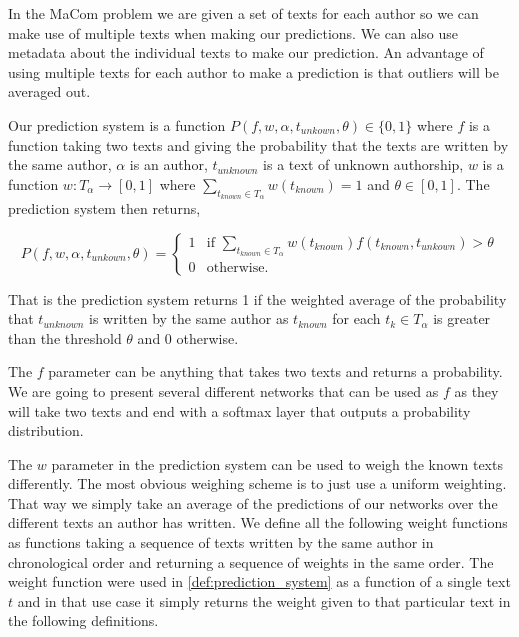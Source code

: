 In the MaCom problem we are given a set of texts for each author so we can make
use of multiple texts when making our predictions. We can also use metadata
about the individual texts to make our prediction. An advantage of using
multiple texts for each author to make a prediction is that outliers will be
averaged out.

\begin{definition}

    \label{def:prediction_system}

    Our prediction system is a function $P(f, w, \alpha, t_{unkown}, \theta)
    \in \{0, 1\}$ where $f$ is a function taking two texts and giving the
    probability that the texts are written by the same author, $\alpha$ is an
    author, $t_{unknown}$ is a text of unknown authorship, $w$ is a function
    $w:T_\alpha \rightarrow [0,1]$ where $\sum_{t_{known} \in T_\alpha}
    w(t_{known}) = 1$ and $\theta \in [0,1]$. The prediction system then
    returns,

    \begin{equation}
        P(f, w, \alpha, t_{unkown}, \theta) = \begin{cases}
            1 & \text{if } \sum_{t_{known} \in T_\alpha} w(t_{known}) f(t_{known}, t_{unkown}) > \theta \\
            0 & \text{otherwise}.
        \end{cases}
    \end{equation}

\end{definition}

That is the prediction system returns 1 if the weighted average of the
probability that $t_{unknown}$ is written by the same author as $t_{known}$ for
each $t_k \in T_\alpha$ is greater than the threshold $\theta$ and 0 otherwise.

The $f$ parameter can be anything that takes two texts and returns a
probability. We are going to present several different networks that can be used
as $f$ as they will take two texts and end with a softmax layer that outputs a
probability distribution.

The $w$ parameter in the prediction system can be used to weigh the known
texts differently. The most obvious weighing scheme is to just use a uniform
weighting. That way we simply take an average of the predictions of our networks
over the different texts an author has written. We define all the following
weight functions as functions taking a sequence of texts written by the same
author in chronological order and returning a sequence of weights in the same
order. The weight function were used in \ref{def:prediction_system} as a
function of a single text $t$ and in that use case it simply returns the weight
given to that particular text in the following definitions.

